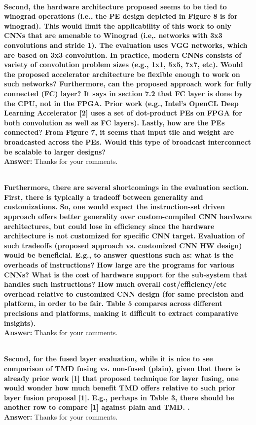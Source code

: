 \documentclass[12pt]{paper}
\newcommand{\rev}[1]{{{\color[rgb]{0,0,1}{#1}}}}
\newcommand{\answer}[1]{\noindent\textbf{Answer:} #1}
\newcommand{\comment}[1]{\noindent\textbf{\\ #1}\\}
\begin{document}
\comment{Second, the hardware architecture proposed seems to be tied to winograd operations (i.e., the PE design depicted in Figure 8 is for winograd). This would limit the applicability of this work to only CNNs that are amenable to Winograd (i.e,. networks with 3x3 convolutions and stride 1). The evaluation uses VGG networks, which are based on 3x3 convolution. In practice, modern CNNs consists of variety of convolution problem sizes (e.g., 1x1, 5x5, 7x7, etc). Would the proposed accelerator architecture be flexible enough to work on such networks? Furthermore, can the proposed approach work for fully connected (FC) layer? It says in section 7.2 that FC layer is done by the CPU, not in the FPGA. Prior work (e.g., Intel’s OpenCL Deep Learning Accelerator [2] uses a set of dot-product PEs on FPGA for both convolution as well as FC layers). Lastly, how are the PEs connected? From Figure 7, it seems that input tile and weight are broadcasted across the PEs. Would this type of broadcast interconnect be scalable to larger designs? 
}
\answer{Thanks for your comments.}
\rev{We have corrected this error.}

\comment{Furthermore, there are several shortcomings in the evaluation section. \\
First, there is typically a tradeoff between generality and customizations. So, one would expect the instruction-set driven approach offers better generality over custom-compiled CNN hardware architectures, but could lose in efficiency since the hardware architecture is not customized for specific CNN target. Evaluation of such tradeoffs (proposed approach vs. customized CNN HW design) would be beneficial. E.g., to answer questions such as: what is the overheads of instructions? How large are the programs for various CNNs? What is the cost of hardware support for the sub-system that handles such instructions? How much overall cost/efficiency/etc overhead relative to customized CNN design (for same precision and platform, in order to be fair. Table 5 compares across different precisions and platforms, making it difficult to extract comparative insights). 
}
\answer{Thanks for your comments.}
\rev{We have corrected this error.}

\comment{Second, for the fused layer evaluation, while it is nice to see comparison of TMD fusing vs. non-fused (plain), given that there is already prior work [1] that proposed technique for layer fusing, one would wonder how much benefit TMD offers relative to such prior layer fusion proposal [1]. E.g., perhaps in Table 3, there should be another row to compare [1] against plain and TMD. . 
}
\answer{Thanks for your comments.}
\rev{We have corrected this error.}
\end{document}
